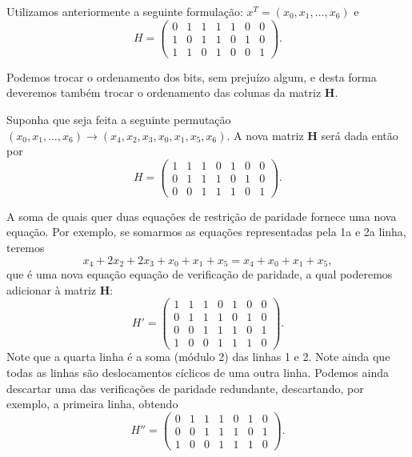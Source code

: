 \begin{frame}[allowframebreaks]
    Utilizamos anteriormente a seguinte formulação:
        $x^{T} = (x_0, x_1, \ldots, x_6)$ e
        \begin{equation}
        H = 
        \begin{pmatrix}
        0 & 1 & 1 & 1 & 1 & 0 & 0 \\
        1 & 0 & 1 & 1 & 0 & 1 & 0 \\
        1 & 1 & 0 & 1 & 0 & 0 & 1 
        \end{pmatrix}.
        \end{equation}

      Podemos trocar o ordenamento dos bits, sem prejuízo algum, e desta forma deveremos também
      trocar o ordenamento das colunas da matriz $\mathbf{H}$.

      Suponha que seja feita a seguinte permutação
      $(x_0, x_1, \ldots, x_6) \rightarrow (x_4, x_2, x_3, x_0, x_1, x_5, x_6)$. 
      A nova matriz $\mathbf{H}$ será dada então por
        \begin{equation}
        H = 
        \begin{pmatrix}
        1 & 1 & 1 & 0 & 1 & 0 & 0 \\
        0 & 1 & 1 & 1 & 0 & 1 & 0 \\
        0 & 0 & 1 & 1 & 1 & 0 & 1 
        \end{pmatrix}.
        \end{equation}


    A soma de quais quer duas equações de restrição de paridade fornece uma nova equação.
    Por exemplo, se somarmos as equações representadas pela 1a e 2a linha, teremos
    \begin{equation}
    x_4 + 2 x_2 + 2 x_3 + x_0 + x_1 + x_5 = x_4 + x_0 + x_1 + x_5 ,
    \end{equation}
    que é uma nova equação equação de verificação de paridade, a qual poderemos adicionar à matriz $\mathbf{H}$:
        \begin{equation}
        H' = 
        \begin{pmatrix}
        1 & 1 & 1 & 0 & 1 & 0 & 0 \\
        0 & 1 & 1 & 1 & 0 & 1 & 0 \\
        0 & 0 & 1 & 1 & 1 & 0 & 1 \\
	1 & 0 & 0 & 1 & 1 & 1 & 0
        \end{pmatrix}.
        \end{equation}
    Note que a quarta linha é a soma (módulo 2) das linhas 1 e 2. Note ainda que todas as linhas são
    deslocamentos cíclicos de uma outra linha. Podemos ainda descartar uma das verificações de paridade
    redundante, descartando, por exemplo, a primeira linha, obtendo
        \begin{equation}
        H'' = 
        \begin{pmatrix}
        0 & 1 & 1 & 1 & 0 & 1 & 0 \\
        0 & 0 & 1 & 1 & 1 & 0 & 1 \\
        1 & 0 & 0 & 1 & 1 & 1 & 0
        \end{pmatrix}.
        \end{equation}


\end{frame}
